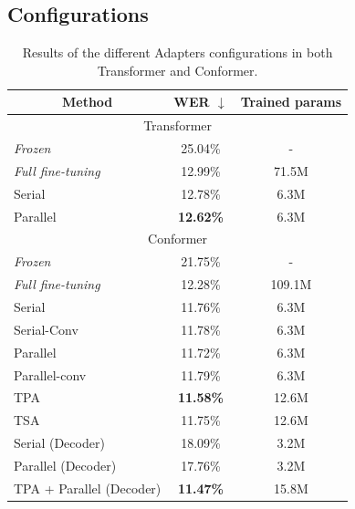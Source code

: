 \subsection{Configurations}
\begin{table}[t]
\caption{Results of the different Adapters configurations in both Transformer and Conformer.}
\begin{center}    
\begin{tabular}{ccc}
\hline
 Method & WER $\downarrow$     & Trained params    \\ \hline \hline
\multicolumn{3}{c}{Transformer} \\ \hline
\multicolumn{1}{l}{\textit{Frozen}} & 25.04\%   & - \\
\multicolumn{1}{l}{\textit{Full fine-tuning}} & 12.99\% & 71.5M \\ \hline
\multicolumn{1}{l}{Serial}  &   12.78\% & 6.3M  \\ 
\multicolumn{1}{l}{Parallel}  &     \textbf{12.62\%} & 6.3M  \\ \hline\hline
\multicolumn{3}{c}{Conformer} \\ \hline
\multicolumn{1}{l}{\textit{Frozen}} & 21.75\%   & - \\ 
\multicolumn{1}{l}{\textit{Full fine-tuning}} & 12.28\% & 109.1M \\ \hline
\multicolumn{1}{l}{Serial}  &   11.76\% & 6.3M  \\ %
\multicolumn{1}{l}{Serial-Conv} & 11.78\%     & 6.3M  \\
\multicolumn{1}{l}{Parallel}    & 11.72\% & 6.3M  \\ %
\multicolumn{1}{l}{Parallel-conv} & 11.79\%      & 6.3M  \\ %
\multicolumn{1}{l}{TPA} & \textbf{11.58\%}     & 12.6M  \\ %
\multicolumn{1}{l}{TSA} & 11.75\%     & 12.6M  \\ \hline %
\multicolumn{1}{l}{Serial (Decoder)} & 18.09\%     & 3.2M  \\ 
\multicolumn{1}{l}{Parallel (Decoder)} &17.76\%     & 3.2M  \\ \hline
\multicolumn{1}{l}{TPA + Parallel (Decoder)} & \textbf{11.47\%}     & 15.8M  \\ \hline

\end{tabular}
\end{center}

\label{tab:res_config}
\end{table}

